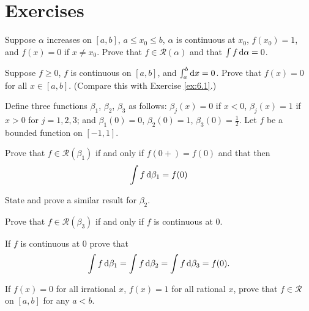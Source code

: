
\section{Exercises}

\begin{myexercise}
    \label{ex:6.1}
    Suppose $\alpha$ increases on $[a, b]$, $a \leq x_0 \leq b$, 
    $\alpha$ is continuous at $x_0$, $f(x_0) = 1$, and
    $f(x) = 0$ if $x \neq x_0$. 
    Prove that $f \in \mathscr{R}(\alpha)$ and that $\int f \d \alpha = 0$.
\end{myexercise}


\begin{myexercise}
    \label{ex:6.2}
    Suppose $f \geq 0$, 
    $f$ is continuous on $[a, b]$, and
    $\int_{a}^{b} \d x = 0$. 
    Prove that $f(x) = 0$
    for all $x \in [a, b]$. 
    (Compare this with Exercise \ref{ex:6.1}.)
\end{myexercise}


\begin{myexercise}
    \label{ex:6.3}
    Define three functions $\beta_1$, $\beta_2$, $\beta_3$ as follows: 
    $\beta_j(x) = 0$ if $x < 0$, 
    $\beta_j(x) = 1$ if $x > 0$ 
    for $j = 1, 2, 3$; 
    and $\beta_1(0) = 0$, $\beta_2(0) =1$, $\beta_3(0) = \frac{1}{2}$. Let $f$ be a bounded function on $[-1,1]$.
    \begin{asparaenum}[(a)]
        \item Prove that $f \in \mathscr{R}(\beta_1)$ if and only if $f(0+) = f(0)$ and that then 
        \begin{equation*}
            \int f \d \beta_1 = f(0)
        \end{equation*}
        \item State and prove a similar result for $\beta_2$.
        \item Prove that $f \in \mathscr{R}(\beta_3)$ if and only if $f$ is continuous at 0.
        \item If $f$ is continuous at 0 prove that 
        \begin{equation*}
            \int f \d \beta_1 = 
            \int f \d \beta_2 = 
            \int f \d \beta_3 = f(0).
        \end{equation*}
    \end{asparaenum}
\end{myexercise}


\begin{myexercise}
    \label{ex:6.4}
    If $f(x) = 0$ for all irrational $x$,
    $f(x) = 1$ for all rational $x$, 
    prove that $f \in \mathscr{R}$ on $[a, b]$ for any $a < b$.
\end{myexercise}


